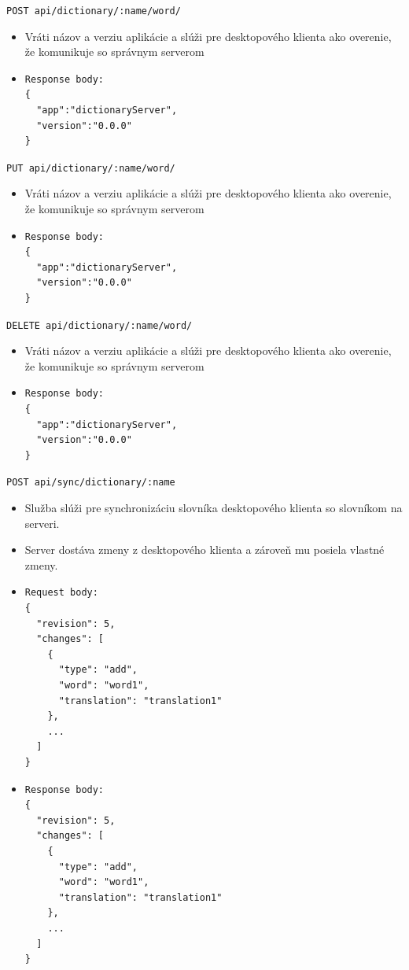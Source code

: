 \documentclass[
  digital, %
  table,   %
  lof,     %
  lot,     %
]{fithesis3}
\begin{document}
\noindent
\texttt{POST api/dictionary/:name/word/}
\begin{itemize}
\item Vráti názov a verziu aplikácie a slúži pre desktopového klienta ako overenie, že komunikuje so správnym serverom
\item \begin{lstlisting}[basicstyle=\small]
Response body:
{
  "app":"dictionaryServer",
  "version":"0.0.0"
}
\end{lstlisting}
\end{itemize}

\noindent
\texttt{PUT api/dictionary/:name/word/}
\begin{itemize}
\item Vráti názov a verziu aplikácie a slúži pre desktopového klienta ako overenie, že komunikuje so správnym serverom
\item \begin{lstlisting}[basicstyle=\small]
Response body:
{
  "app":"dictionaryServer",
  "version":"0.0.0"
}
\end{lstlisting}
\end{itemize}

\noindent
\texttt{DELETE api/dictionary/:name/word/}
\begin{itemize}
\item Vráti názov a verziu aplikácie a slúži pre desktopového klienta ako overenie, že komunikuje so správnym serverom
\item \begin{lstlisting}[basicstyle=\small]
Response body:
{
  "app":"dictionaryServer",
  "version":"0.0.0"
}
\end{lstlisting}
\end{itemize}

\noindent
\texttt{POST api/sync/dictionary/:name}
\begin{itemize}
\item Služba slúži pre synchronizáciu slovníka desktopového klienta so slovníkom na serveri.
\item Server dostáva zmeny z desktopového klienta a zároveň mu posiela vlastné zmeny.
\item \begin{lstlisting}[basicstyle=\small]
Request body:
{
  "revision": 5,
  "changes": [
    {
      "type": "add",
      "word": "word1",
      "translation": "translation1"
    },
    ...
  ]
}
\end{lstlisting}
\item \begin{lstlisting}[basicstyle=\small]
Response body:
{
  "revision": 5,
  "changes": [
    {
      "type": "add",
      "word": "word1",
      "translation": "translation1"
    },
    ...
  ]
}
\end{lstlisting}
\end{itemize}
\end{document}
